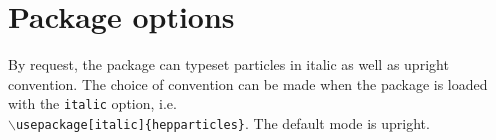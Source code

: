 \documentclass[12pt]{article}
\begin{document}



\section{Package options}
By request, the package can typeset particles in italic as well as upright
convention. The choice of convention can be made when the package is loaded with
the \texttt{italic} %
option, i.e.\\
\texttt{$\backslash{}$usepackage[italic]\{hepparticles\}}.
The default mode is upright. %
\end{document}

